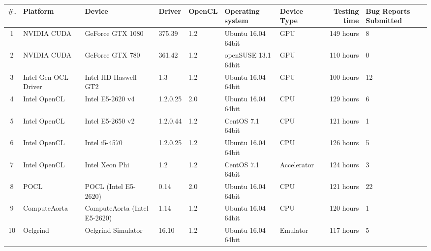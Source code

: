 \begin{tabular}{ cllllll | rR{1.4cm} }
\toprule
\textbf{\#. } & \textbf{Platform} & \textbf{Device} & \textbf{Driver} & \textbf{OpenCL} & 
\textbf{Operating system} & \textbf{Device Type} & \textbf{Testing time} & \textbf{Bug Reports Submitted} \\
 & NVIDIA CUDA & GeForce GTX 1080 & 375.39 & 1.2 & Ubuntu 16.04 64bit & GPU & 149 hours & 8 \\
2 & NVIDIA CUDA & GeForce GTX 780 & 361.42 & 1.2 & openSUSE  13.1 64bit & GPU & 110 hours & 0 \\
3 & Intel Gen OCL Driver & Intel HD Haswell GT2 & 1.3 & 1.2 & Ubuntu 16.04 64bit & GPU & 100 hours & 12 \\
4 & Intel OpenCL & Intel E5-2620 v4 & 1.2.0.25 & 2.0 & Ubuntu 16.04 64bit & CPU & 129 hours & 6 \\
5 & Intel OpenCL & Intel E5-2650 v2 & 1.2.0.44 & 1.2 & CentOS 7.1 64bit & CPU & 121 hours & 1 \\
6 & Intel OpenCL & Intel i5-4570 & 1.2.0.25 & 1.2 & Ubuntu 16.04 64bit & CPU & 126 hours & 5 \\
7 & Intel OpenCL & Intel Xeon Phi & 1.2 & 1.2 & CentOS 7.1 64bit & Accelerator & 124 hours & 3 \\
8 & POCL & POCL (Intel E5-2620) & 0.14 & 2.0 & Ubuntu 16.04 64bit & CPU & 121 hours & 22 \\
9 & ComputeAorta & ComputeAorta (Intel E5-2620) & 1.14 & 1.2 & Ubuntu 16.04 64bit & CPU & 120 hours & 1 \\
10 & Oclgrind & Oclgrind Simulator & 16.10 & 1.2 & Ubuntu 16.04 64bit & Emulator & 117 hours & 5 \\

\bottomrule
\end{tabular}

